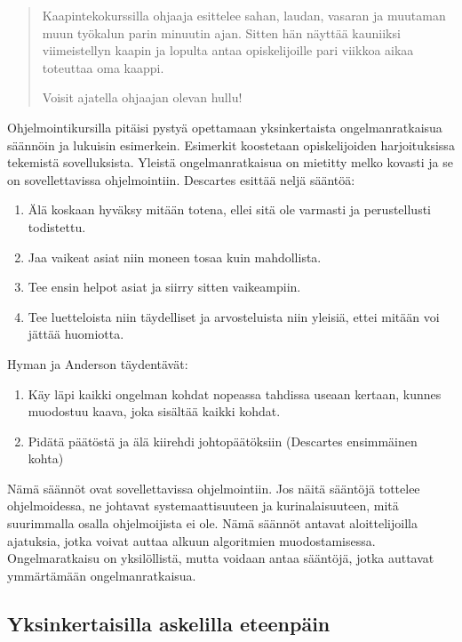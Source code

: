 \documentclass{tktltiki}
\begin{document}
\begin{quotation}
Kaapintekokurssilla ohjaaja esittelee sahan, laudan, vasaran ja muutaman muun työkalun parin minuutin ajan. Sitten hän näyttää kauniiksi viimeistellyn kaapin ja lopulta antaa opiskelijoille pari viikkoa aikaa toteuttaa oma kaappi.

Voisit ajatella ohjaajan olevan hullu!
\end{quotation}

Ohjelmointikursilla pitäisi pystyä opettamaan yksinkertaista ongelmanratkaisua säännöin ja lukuisin esimerkein. Esimerkit koostetaan opiskelijoiden harjoituksissa tekemistä sovelluksista. Yleistä ongelmanratkaisua on mietitty melko kovasti ja se on sovellettavissa ohjelmointiin. Descartes esittää neljä sääntöä:

\begin{enumerate}
  \item Älä koskaan hyväksy mitään totena, ellei sitä ole varmasti ja perustellusti todistettu.
  \item Jaa vaikeat asiat niin moneen tosaa kuin mahdollista.
  \item Tee ensin helpot asiat ja siirry sitten vaikeampiin.
  \item Tee luetteloista niin täydelliset ja arvosteluista niin yleisiä, ettei mitään voi jättää huomiotta.
\end{enumerate}

Hyman ja Anderson täydentävät:

\begin{enumerate}
  \item Käy läpi kaikki ongelman kohdat nopeassa tahdissa useaan kertaan, kunnes muodostuu kaava, joka sisältää kaikki kohdat.
  \item Pidätä päätöstä ja älä kiirehdi johtopäätöksiin (Descartes ensimmäinen kohta)
\end{enumerate}

Nämä säännöt ovat sovellettavissa ohjelmointiin. Jos näitä sääntöjä tottelee ohjelmoidessa, ne johtavat systemaattisuuteen ja kurinalaisuuteen, mitä suurimmalla osalla ohjelmoijista ei ole. Nämä säännöt antavat aloittelijoilla ajatuksia, jotka voivat auttaa alkuun algoritmien muodostamisessa. Ongelmaratkaisu on yksilöllistä, mutta voidaan antaa sääntöjä, jotka auttavat ymmärtämään ongelmanratkaisua.

\subsection{Yksinkertaisilla askelilla eteenpäin}
\end{document}
